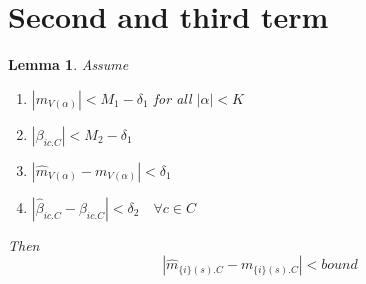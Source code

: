 \documentclass[]{article}
\newtheorem{lemma}{Lemma}
\begin{document}
\section{Second and third term}
\begin{lemma}
Assume
\begin{enumerate}
\item $|m_{V(\alpha)}| < M_1 - \delta_1 $ for all $|\alpha| < K$
\item  $|\beta_{ic.C}| < M_2 - \delta_1 $
\item $|\hat m_{V(\alpha)} - m_{V(\alpha)}| < \delta_1 $
\item$|\hat \beta_{ic.C} - \beta_{ic.C}| < \delta_2 \quad \forall c \in C$
\end{enumerate}

Then
\[|\hat m_{\{i\}(s).C} - m_{\{i\}(s).C}|  < bound\]
\end{lemma}
\end{document}
